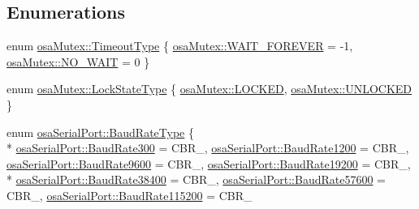 \subsection*{Enumerations}
\begin{DoxyCompactItemize}
\item 
enum \hyperlink{group__cisst_o_s_abstraction_ga1331d5ff33336e89fc504125ddbc41a6}{osa\+Mutex\+::\+Timeout\+Type} \{ \hyperlink{group__cisst_o_s_abstraction_gga1331d5ff33336e89fc504125ddbc41a6a0fa63ec436bd067c5fa29a458799ed8e}{osa\+Mutex\+::\+W\+A\+I\+T\+\_\+\+F\+O\+R\+E\+V\+E\+R} = -\/1, 
\hyperlink{group__cisst_o_s_abstraction_gga1331d5ff33336e89fc504125ddbc41a6a8de433eae9ef48be38321f282630a923}{osa\+Mutex\+::\+N\+O\+\_\+\+W\+A\+I\+T} = 0
 \}
\item 
enum \hyperlink{group__cisst_o_s_abstraction_gad75274806c7433f960e8ff0c8c9d7470}{osa\+Mutex\+::\+Lock\+State\+Type} \{ \hyperlink{group__cisst_o_s_abstraction_ggad75274806c7433f960e8ff0c8c9d7470a9a1066b23b0fa8c5ede7400b850dbd5a}{osa\+Mutex\+::\+L\+O\+C\+K\+E\+D}, 
\hyperlink{group__cisst_o_s_abstraction_ggad75274806c7433f960e8ff0c8c9d7470a4173bfeaab7cd673588015a5529022fa}{osa\+Mutex\+::\+U\+N\+L\+O\+C\+K\+E\+D}
 \}
\item 
enum \hyperlink{group__cisst_o_s_abstraction_ga3fd8e997892088f924754f9cc11c78a4}{osa\+Serial\+Port\+::\+Baud\+Rate\+Type} \{ \\*
\hyperlink{group__cisst_o_s_abstraction_gga3fd8e997892088f924754f9cc11c78a4a08e94a0922c5c317757e7bdb740f5cb7}{osa\+Serial\+Port\+::\+Baud\+Rate300} = C\+B\+R\+\_, 
\hyperlink{group__cisst_o_s_abstraction_gga3fd8e997892088f924754f9cc11c78a4aadeeea8f2d03e0f63cf12f7ee3e551e4}{osa\+Serial\+Port\+::\+Baud\+Rate1200} = C\+B\+R\+\_, 
\hyperlink{group__cisst_o_s_abstraction_gga3fd8e997892088f924754f9cc11c78a4afa244211a27f53da723216a5f75f7a23}{osa\+Serial\+Port\+::\+Baud\+Rate9600} = C\+B\+R\+\_, 
\hyperlink{group__cisst_o_s_abstraction_gga3fd8e997892088f924754f9cc11c78a4a1c2619ec6ac6aed88a0cc1a191c2d316}{osa\+Serial\+Port\+::\+Baud\+Rate19200} = C\+B\+R\+\_, 
\\*
\hyperlink{group__cisst_o_s_abstraction_gga3fd8e997892088f924754f9cc11c78a4ad41434f114e9a21aa61cabcddd046c31}{osa\+Serial\+Port\+::\+Baud\+Rate38400} = C\+B\+R\+\_, 
\hyperlink{group__cisst_o_s_abstraction_gga3fd8e997892088f924754f9cc11c78a4acac3e08c015fca13ddd5af5d29c375c7}{osa\+Serial\+Port\+::\+Baud\+Rate57600} = C\+B\+R\+\_, 
\hyperlink{group__cisst_o_s_abstraction_gga3fd8e997892088f924754f9cc11c78a4aafbcbc19a9e307dca2332f1aa6500373}{osa\+Serial\+Port\+::\+Baud\+Rate115200} = C\+B\+R\+\_

\end{DoxyCompactItemize}
